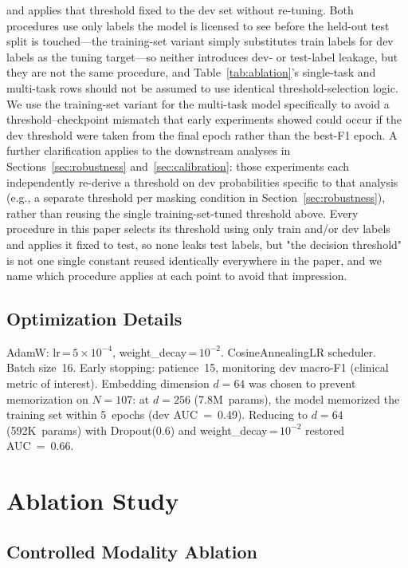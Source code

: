 \documentclass[journal]{IEEEtran}
\begin{document}
and applies that threshold fixed to the dev set without re-tuning.
Both procedures use only labels the model is licensed to see before
the held-out test split is touched---the training-set variant simply
substitutes train labels for dev labels as the tuning target---so
neither introduces dev- or test-label leakage, but they are not the
same procedure, and Table~\ref{tab:ablation}'s single-task and
multi-task rows should not be assumed to use identical
threshold-selection logic. We use the training-set variant for the
multi-task model specifically to avoid a threshold–checkpoint
mismatch that early experiments showed could occur if the dev
threshold were taken from the final epoch rather than the best-F1
epoch. A further clarification applies to the downstream analyses in
Sections~\ref{sec:robustness} and~\ref{sec:calibration}: those
experiments each independently re-derive a threshold on dev
probabilities specific to that analysis (e.g., a separate threshold
per masking condition in Section~\ref{sec:robustness}), rather than
reusing the single training-set-tuned threshold above. Every
procedure in this paper selects its threshold using only train and/or
dev labels and applies it fixed to test, so none leaks test labels,
but "the decision threshold" is not one single constant reused
identically everywhere in the paper, and we name which procedure
applies at each point to avoid that impression.

\subsection{Optimization Details}

AdamW: lr\,=\,$5\!\times\!10^{-4}$, weight\_decay\,=\,$10^{-2}$.
CosineAnnealingLR scheduler. Batch size~16. Early stopping:
patience~15, monitoring dev macro-F1 (clinical metric of interest).
Embedding dimension $d=64$ was chosen to prevent memorization on
$N=107$: at $d=256$ (7.8M~params), the model memorized the training
set within 5~epochs (dev AUC~=~0.49). Reducing to $d=64$ (592K~params)
with Dropout(0.6) and weight\_decay\,=\,$10^{-2}$ restored AUC~=~0.66.

\section{Ablation Study}
\label{sec:ablation}

\subsection{Controlled Modality Ablation}
\end{document}
